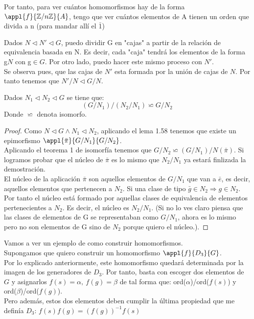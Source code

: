 \documentclass[nochap]{apuntes}
\begin{document}
Por tanto, para ver cuántos homomorfismos hay de la forma $\appl{f}{\mathbb{Z}/n\mathbb{Z}}{A}$, tengo que ver cuántos elementos
de A tienen un orden que divida a n (para mandar allí el $\bar{1}$)\\

\begin{lemma}
 Dados $N\vartriangleleft N' \vartriangleleft G$, puedo dividir G en "cajas" a partir de la relación de equivalencia basada en N. Es decir,
cada "caja" tendrá los elementos de la forma g$N$  con g$\in G$. Por otro lado, puedo hacer este mismo proceso con $N'$.\\
Se observa pues, que las cajas de $N'$  esta formada por la unión de cajas de $N$. Por tanto tenemos que $N'/N \vartriangleleft G/N$.\\
\end{lemma}

\begin{theorem}
 Dados $N_1\vartriangleleft N_2 \vartriangleleft G$  se tiene que:
 \[ (G/N_1)/(N_2/N_1)\backsimeq G/N_2\]
 Donde $\backsimeq$  denota isomorfo.
\end{theorem}

\begin{proof}
 Como $N\vartriangleleft G  \wedge  N_1 \lhd N_2$, aplicando el lema 1.58 tenemos que existe un epimorfismo $\appl{\bar{\pi}}{G/N_1}{G/N_2}$.\\
 Aplicando el teorema 1 de isomorfía tenemos que $G/N_2 \backsimeq (G/N_1)/N(\bar{\pi})$. Si logramos probar que el núcleo de $\bar{\pi}$
 es lo mismo que $N_2/N_1$  ya estará finlizada la demostración.\\
 El núcleo de la aplicación $\bar{\pi}$  son aquellos elementos de $G/N_1$  que van a $\bar{e}$, es decir, aquellos elementos que pertenecen a $N_2$.
 Si una clase de tipo $\bar{g}\in N_2 \Rightarrow g \in N_2$. Por tanto el núcleo está formado por aquellas clases de equivalencia de elementos pertenecientes a $N_2$.
 Es decir, el núcleo es $N_2/N_1$. (Si no lo ves claro piensa que las clases de elementos de G se representaban como $G/N_1$, ahora es lo mismo pero
 no son elementos de G sino de $N_2$  porque quiero el núcleo.).
\end{proof}

\begin{example}
 Vamos a ver un ejemplo de como construir homomorfismos.\\
 Supongamos que quiero construir un homomorfismo $\appl{f}{D_3}{G}$.\\
 Por lo explicado anteriormente, este homomorfismo quedará determinada por la imagen de los generadores de $D_3$. Por tanto,
 basta con escoger dos elementos de $G$  y asignarlos $f(s)=\alpha, \ f(g)=\beta$  de tal forma que: ord($\alpha$)/ord($f(s)$) y ord($\beta$)/ord($f(g)$).\\
 Pero además, estos dos elementos deben cumplir la última propiedad que me definía $D_3$: $f(s)f(g)=(f(g))^{-1}f(s)$
\end{example}
\end{document}
